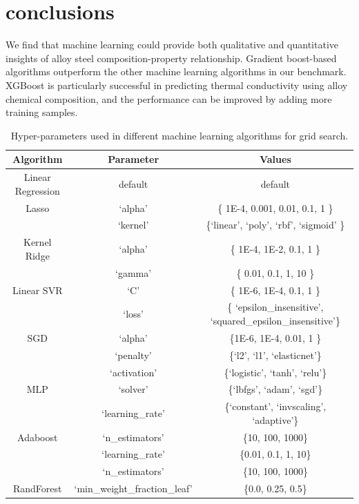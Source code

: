 \documentclass[10pt,aps,prb,amsmath,amssymb,twocolumn,letterpaper,nobalancelastpage,final,citeautoscript,floatfix,raggedbottom,superscriptaddress]{revtex4-1}
\begin{document}
\section{conclusions}
We find that machine learning could provide both qualitative and quantitative insights of alloy steel composition-property relationship. Gradient boost-based algorithms outperform the other machine learning algorithms in our benchmark. XGBoost is particularly successful in predicting thermal conductivity using alloy chemical composition, and the performance can be improved by adding more training samples.

\begin{table}[t]
\begin{ruledtabular}
\caption{Hyper-parameters used in different machine learning algorithms for grid search.\label{tab:hyperparam}}
\centering
\begin{tabular}{ccc}
\sffamily Algorithm & \sffamily Parameter & \sffamily Values \\
\hline
Linear Regression & default & default \\
\hline
Lasso & `alpha' & \{ 1E-4, 0.001, 0.01, 0.1, 1 \}\\
\hline
& `kernel' & \{`linear', `poly', `rbf', `sigmoid' \} \\
Kernel Ridge & `alpha' & \{ 1E-4, 1E-2, 0.1, 1 \} \\
& `gamma' & \{ 0.01, 0.1, 1, 10 \} \\
\hline
Linear SVR & `C' & \{ 1E-6, 1E-4, 0.1, 1 \} \\
& `loss' & \{ `epsilon\_insensitive', `squared\_epsilon\_insensitive'\} \\
\hline
SGD & `alpha' & \{1E-6, 1E-4, 0.01, 1 \} \\
& `penalty' & \{`l2', `l1', `elasticnet'\} \\
\hline
& `activation' & \{`logistic', `tanh', `relu'\} \\
MLP & `solver' & \{`lbfgs', `adam', `sgd'\} \\
& `learning\_rate' & \{`constant', `invscaling', `adaptive'\} \\
\hline
Adaboost & `n\_estimators' & \{10, 100, 1000\} \\
& `learning\_rate' & \{0.01, 0.1, 1, 10\} \\
\hline
& `n\_estimators' & \{10, 100, 1000\} \\
RandForest& `min\_weight\_fraction\_leaf' & \{0.0, 0.25, 0.5\} \\

\end{tabular}
\end{ruledtabular}
\end{table}
\end{document}
